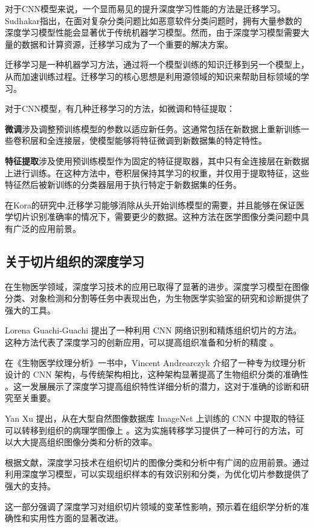 对于CNN模型来说，一个显而易见的提升深度学习性能的方法是迁移学习。Sudhakar指出，在面对复杂分类问题比如恶意软件分类问题时，拥有大量参数的深度学习模型性能会显著优于传统机器学习模型。然而，由于深度学习模型需要大量的数据和计算资源，迁移学习成为了一个重要的解决方案。\cite{5.1 2}

迁移学习是一种机器学习方法，通过将一个模型训练的知识迁移到另一个模型上，从而加速训练过程。迁移学习的核心思想是利用源领域的知识来帮助目标领域的学习。\cite{4.30 4}

对于CNN模型，有几种迁移学习的方法，如微调和特征提取：

\textbf{微调}涉及调整预训练模型的参数以适应新任务。这通常包括在新数据上重新训练一些卷积层和全连接层，使模型能够将特征微调到新数据集的特定特性。\cite{4.30 5}

\textbf{特征提取}涉及使用预训练模型作为固定的特征提取器，其中只有全连接层在新数据上进行训练。在这种方法中，卷积层保持其学习的权重，并仅用于提取特征，这些特征然后被新训练的分类器层用于执行特定于新数据集的任务。\cite{4.30 6}

在Kora的研究中\cite{5.1 3},迁移学习能够消除从头开始训练模型的需要，并且能够在保证医学切片识别准确率的情况下，需要更少的数据。这种方法在医学图像分类问题中具有广泛的应用前景。

\subsection{关于切片组织的深度学习}

在生物医学领域，深度学习技术的应用已取得了显著的进步。深度学习模型在图像分类、对象检测和分割等任务中表现出色，为生物医学实验室的研究和诊断提供了强大的工具。

Lorena Guachi-Guachi 提出了一种利用 CNN 网络识别和精炼组织切片的方法。这种方法代表了深度学习的创新应用，可以提高组织准备和分析的精度 \cite{LR.7}。

在《生物医学纹理分析》一书中，Vincent Andrearczyk 介绍了一种专为纹理分析设计的 CNN 架构，与传统架构相比，这种架构显著提高了生物组织分类的准确性 \cite{LR.8}。这一发展展示了深度学习提高组织特性详细分析的潜力，这对于准确的诊断和研究至关重要。

Yan Xu 提出，从在大型自然图像数据库 ImageNet 上训练的 CNN 中提取的特征可以转移到组织的病理学图像上 \cite{LR.9}。这为实施转移学习提供了一种可行的方法，可以大大提高组织图像分类和分析的效率。

根据文献，深度学习技术在组织切片的图像分类和分析中有广阔的应用前景。通过利用深度学习模型，可以实现组织样本的有效识别和分类，为优化切片参数提供了强大的支持。

这一部分强调了深度学习对组织切片领域的变革性影响，预示着在组织学分析的准确性和实用性方面的显著改进。

\FloatBarrier %
